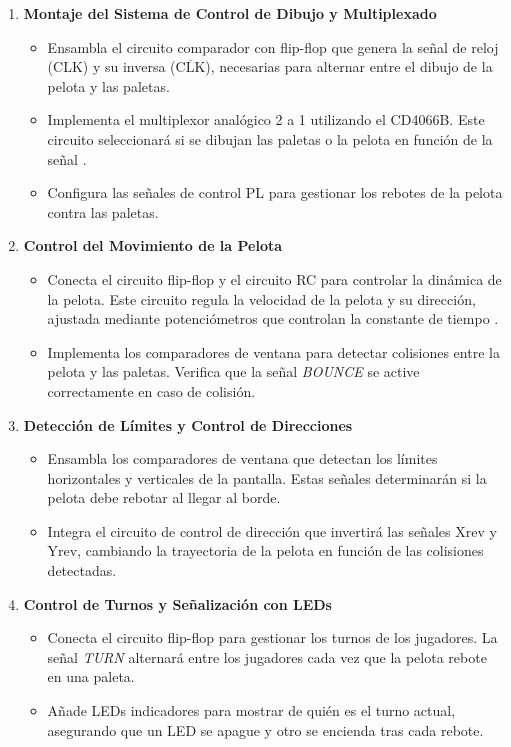 \begin{enumerate}
\item \textbf{Montaje del Sistema de Control de Dibujo y Multiplexado}
\begin{itemize}
\item Ensambla el circuito comparador con flip-flop que genera la señal de reloj (CLK) y su inversa ($\overline{\text{CLK}}$), necesarias para alternar entre el dibujo de la pelota y las paletas.
\item Implementa el multiplexor analógico 2 a 1 utilizando el CD4066B. Este circuito seleccionará si se dibujan las paletas o la pelota en función de la señal .
\item Configura las señales de control PL para gestionar los rebotes de la pelota contra las paletas.
\end{itemize}

\item \textbf{Control del Movimiento de la Pelota}
\begin{itemize}
\item Conecta el circuito flip-flop y el circuito RC para controlar la dinámica de la pelota. Este circuito regula la velocidad de la pelota y su dirección, ajustada mediante potenciómetros que controlan la constante de tiempo .
\item Implementa los comparadores de ventana para detectar colisiones entre la pelota y las paletas. Verifica que la señal \textit{BOUNCE} se active correctamente en caso de colisión.
\end{itemize}

\item \textbf{Detección de Límites y Control de Direcciones}
\begin{itemize}
\item Ensambla los comparadores de ventana que detectan los límites horizontales y verticales de la pantalla. Estas señales determinarán si la pelota debe rebotar al llegar al borde.
\item Integra el circuito de control de dirección que invertirá las señales X${\mathrm{rev}}$ y Y${\mathrm{rev}}$, cambiando la trayectoria de la pelota en función de las colisiones detectadas.
\end{itemize}

\item \textbf{Control de Turnos y Señalización con LEDs}
\begin{itemize}
\item Conecta el circuito flip-flop para gestionar los turnos de los jugadores. La señal \textit{TURN} alternará entre los jugadores cada vez que la pelota rebote en una paleta.
\item Añade LEDs indicadores para mostrar de quién es el turno actual, asegurando que un LED se apague y otro se encienda tras cada rebote.
\end{itemize}


\end{enumerate}
